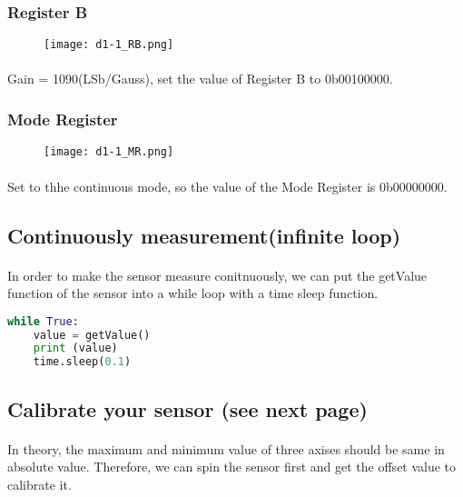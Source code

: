 \subsubsection{Register B}
\begin{figure}[!h]
    \begin{center}
        \texttt{[image: d1-1\_RB.png]}
    \end{center}
\end{figure}
\paragraph{}
Gain = 1090(LSb/Gauss), set the value of Register B to 0b00100000.
\subsubsection{Mode Register}
\begin{figure}[!h]
    \begin{center}
        \texttt{[image: d1-1\_MR.png]}
    \end{center}
\end{figure}
\paragraph{}
Set to thhe continuous mode, so the value of the Mode Register is 0b00000000.
\subsection{Continuously measurement(infinite loop)}
\paragraph{}
In order to make the sensor measure conitnuously, we can put the getValue function of the sensor into a while loop with a time sleep function.
\begin{lstlisting}[language=Python]
while True:
    value = getValue()
    print (value)
    time.sleep(0.1)
\end{lstlisting}
\subsection{Calibrate your sensor (see next page)}
\paragraph{}
In theory, the maximum and minimum value of three axises should be same in absolute value. Therefore, we can spin the sensor first and get the offset value to calibrate it.
